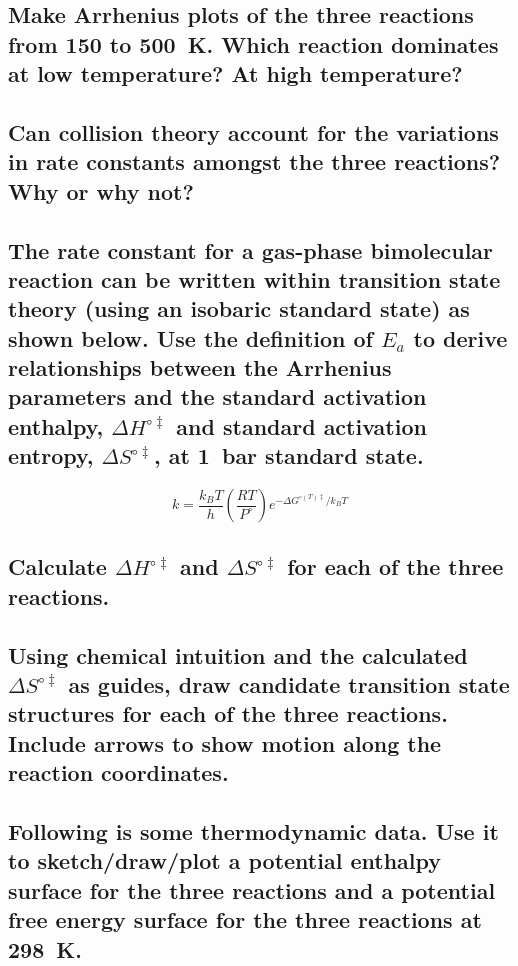 \documentclass[11pt]{article}
\begin{document}
\subsection{Make Arrhenius plots of the three reactions from 150 to \SI{500}{K}.  Which reaction dominates at low temperature?  At high temperature?}
\label{sec:org025a840}

\subsection{Can collision theory account for the variations in rate constants amongst the three reactions?  Why or why not?}
\label{sec:org872d1eb}

\subsection{The rate constant for a gas-phase bimolecular reaction can be written within transition state theory (using an isobaric standard state) as shown below. Use the definition of \(E_a\) to derive relationships between the Arrhenius parameters and the standard activation enthalpy, \(\Delta H^{\circ\ddagger}\) and standard activation entropy, \(\Delta S^{\circ\ddagger}\), at \SI{1}{bar} standard state.}
\label{sec:orgb11d510}

\[ k = \frac{k_B T}{h} \left ( \frac{RT}{P^\circ} \right ) e^{-\Delta G^{\circ(T)\ddagger}/k_B T} \]

\subsection{Calculate \(\Delta H^{\circ\ddagger}\) and \(\Delta S^{\circ\ddagger}\) for each of the three reactions.}
\label{sec:org6c72399}

\subsection{Using chemical intuition and the calculated \(\Delta S^{\circ\ddagger}\) as guides, draw candidate transition state structures for each of the three reactions.  Include arrows to show motion along the reaction coordinates.}
\label{sec:org173f392}

\subsection{Following is some thermodynamic data. Use it to sketch/draw/plot a potential enthalpy surface for the three reactions and a potential free energy surface for the three reactions at \SI{298}{K}.}
\label{sec:orgdb32d31}
\end{document}

